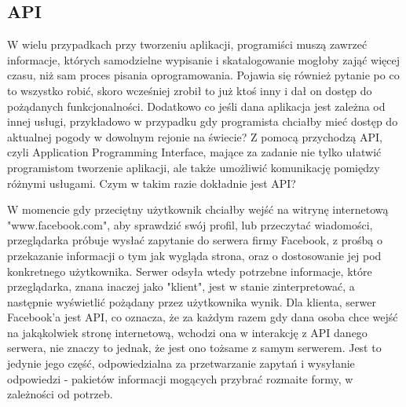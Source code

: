 \documentclass[12pt, a4paper]{article}
\begin{document}
\begin{sloppypar}
{  \subsection{API}
  {
    W wielu przypadkach przy tworzeniu aplikacji, programiści muszą zawrzeć
    informacje, których samodzielne wypisanie i skatalogowanie mogłoby zająć
    więcej czasu, niż sam proces pisania oprogramowania. Pojawia się również
    pytanie po co to wszystko robić, skoro wcześniej zrobił to już ktoś inny i
    dał on dostęp do pożądanych funkcjonalności. Dodatkowo co jeśli dana aplikacja
    jest zależna od innej usługi, przykładowo w przypadku gdy programista chciałby
    mieć dostęp do aktualnej pogody w dowolnym rejonie na świecie? 
    Z pomocą przychodzą API, czyli Application Programming Interface, mające za 
    zadanie nie tylko ułatwić programistom tworzenie aplikacji, ale także 
    umożliwić komunikację pomiędzy różnymi usługami. Czym w takim razie dokładnie jest API?

    W momencie gdy przeciętny użytkownik chciałby wejść na witrynę internetową 
    "www.facebook.com", aby sprawdzić swój profil, lub przeczytać wiadomości, 
    przeglądarka próbuje wysłać zapytanie do serwera firmy Facebook, z prośbą o
    przekazanie informacji o tym jak wygląda strona, oraz o dostosowanie jej pod
    konkretnego użytkownika. Serwer odsyła wtedy potrzebne informacje, które przeglądarka,
    znana inaczej jako "klient", jest w stanie zinterpretować, a następnie wyświetlić 
    pożądany przez użytkownika wynik. Dla klienta, serwer Facebook'a jest API, co oznacza,
    że za każdym razem gdy dana osoba chce wejść na jakąkolwiek stronę internetową,
    wchodzi ona w interakcję z API danego serwera, nie znaczy to jednak, że jest ono
    tożsame z samym serwerem. Jest to jedynie jego część, odpowiedzialna za przetwarzanie
    zapytań i wysyłanie odpowiedzi - pakietów informacji mogących przybrać rozmaite formy,
    w zależności od potrzeb.
    
}}
\end{sloppypar}
\end{document}
